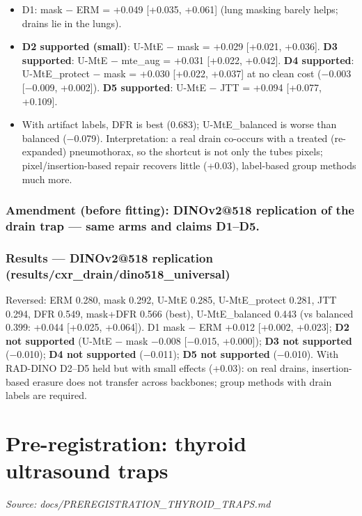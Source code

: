 {\begin{itemize}

\item
  D1: mask − ERM = +0.049 {[}+0.035, +0.061{]} (lung masking barely helps; drains lie in the lungs).
\item
  \textbf{D2 supported (small)}: U-MtE − mask = +0.029 {[}+0.021, +0.036{]}. \textbf{D3 supported}: U-MtE − mte\_aug = +0.031
  {[}+0.022, +0.042{]}. \textbf{D4 supported}: U-MtE\_protect − mask = +0.030 {[}+0.022, +0.037{]} at no clean cost
  (−0.003 {[}−0.009, +0.002{]}). \textbf{D5 supported}: U-MtE − JTT = +0.094 {[}+0.077, +0.109{]}.
\item
  With artifact labels, DFR is best (0.683); U-MtE\_balanced is worse than balanced (−0.079).
  Interpretation: a real drain co-occurs with a treated (re-expanded) pneumothorax, so the shortcut is not only the
  tube\textquotesingle s pixels; pixel/insertion-based repair recovers little (+0.03), label-based group methods much more.
\end{itemize}

\subsubsection{Amendment (before fitting): DINOv2@518 replication of the drain trap --- same arms and claims D1--D5.}\label{amendment-before-fitting-dinov2518-replication-of-the-drain-trap--same-arms-and-claims-d1d5}

\subsubsection{Results --- DINOv2@518 replication (results/cxr\_drain/dino518\_universal)}\label{results--dinov2518-replication-resultscxr_draindino518_universal}

Reversed: ERM 0.280, mask 0.292, U-MtE 0.285, U-MtE\_protect 0.281, JTT 0.294, DFR 0.549, mask+DFR 0.566 (best),
U-MtE\_balanced 0.443 (vs balanced 0.399: +0.044 {[}+0.025, +0.064{]}).
D1 mask − ERM +0.012 {[}+0.002, +0.023{]}; \textbf{D2 not supported} (U-MtE − mask −0.008 {[}−0.015, +0.000{]}); \textbf{D3 not
supported} (−0.010); \textbf{D4 not supported} (−0.011); \textbf{D5 not supported} (−0.010). With RAD-DINO D2--D5 held but
with small effects (+0.03): on real drains, insertion-based erasure does not transfer across backbones; group
methods with drain labels are required.

}

\section{Pre-registration: thyroid ultrasound traps}\label{doc:PREREGISTRATION_THYROID_TRAPS}
\noindent\textit{Source: docs/PREREGISTRATION\_THYROID\_TRAPS.md}

